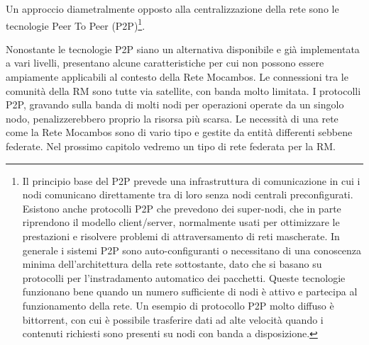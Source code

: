 Un approccio diametralmente opposto alla centralizzazione della rete
sono le tecnologie Peer To Peer (P2P)\footnote{Il principio base del
  P2P prevede una infrastruttura di comunicazione in cui i nodi
  comunicano direttamente tra di loro senza nodi centrali
  preconfigurati. Esistono anche protocolli P2P che prevedono dei
  super-nodi, che in parte riprendono il modello client/server,
  normalmente usati per ottimizzare le prestazioni e risolvere
  problemi di attraversamento di reti mascherate. In generale i
  sistemi P2P sono auto-configuranti o necessitano di una conoscenza
  minima dell'architettura della rete sottostante, dato che si basano
  su protocolli per l'instradamento automatico dei pacchetti. Queste
  tecnologie funzionano bene quando un numero sufficiente di nodi è
  attivo e partecipa al funzionamento della rete. Un esempio di
  protocollo P2P molto diffuso è bittorrent, con cui è possibile
  trasferire dati ad alte velocità quando i contenuti richiesti sono
  presenti su nodi con banda a disposizione.}.

Nonostante le tecnologie P2P siano un alternativa disponibile e già
implementata a vari livelli, presentano alcune caratteristiche per cui
non possono essere ampiamente applicabili al contesto della Rete
Mocambos. Le connessioni tra le comunità della RM sono tutte via
satellite, con banda molto limitata. I protocolli P2P, gravando sulla
banda di molti nodi per operazioni operate da un singolo nodo,
penalizzerebbero proprio la risorsa più scarsa. Le necessità di una
rete come la Rete Mocambos sono di vario tipo e gestite da entità
differenti sebbene federate. Nel prossimo capitolo vedremo un tipo di
rete federata per la RM.

